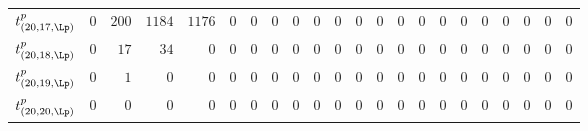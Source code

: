 \begin{tabular}{r|rrrrrrrrrrrrrrrrrrrrr}
  $t^{p}_{(20,17,\Lp)}$ & $0$ & $200$ & $1184$ & $1176$ & $0$ & $0$ & $0$ & $0$ & $0$ & $0$ & $0$ & $0$ & $0$ & $0$ & $0$ & $0$ & $0$ & $0$ & $0$ & $0$ & $0$ \\
  $t^{p}_{(20,18,\Lp)}$ & $0$ & $17$ & $34$ & $0$ & $0$ & $0$ & $0$ & $0$ & $0$ & $0$ & $0$ & $0$ & $0$ & $0$ & $0$ & $0$ & $0$ & $0$ & $0$ & $0$ & $0$ \\
  $t^{p}_{(20,19,\Lp)}$ & $0$ & $1$ & $0$ & $0$ & $0$ & $0$ & $0$ & $0$ & $0$ & $0$ & $0$ & $0$ & $0$ & $0$ & $0$ & $0$ & $0$ & $0$ & $0$ & $0$ & $0$ \\
  $t^{p}_{(20,20,\Lp)}$ & $0$ & $0$ & $0$ & $0$ & $0$ & $0$ & $0$ & $0$ & $0$ & $0$ & $0$ & $0$ & $0$ & $0$ & $0$ & $0$ & $0$ & $0$ & $0$ & $0$ & $0$ \\
\end{tabular}
